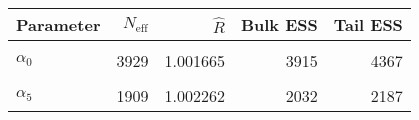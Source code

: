 \begin{table}[!h]
\centering
\begin{tabular}{>{\raggedright\arraybackslash}p{2cm}rrrr}
\toprule
Parameter & $N_{\text{eff}}$ & $\widehat{R}$ & Bulk ESS & Tail ESS\\
\midrule
\cellcolor{gray!6}{$\rho$} & \cellcolor{gray!6}{43125} & \cellcolor{gray!6}{1.000067} & \cellcolor{gray!6}{43177} & \cellcolor{gray!6}{41698}\\
$\alpha_{0}$ & 3929 & 1.001665 & 3915 & 4367\\
\cellcolor{gray!6}{$\alpha_{2}$} & \cellcolor{gray!6}{3150} & \cellcolor{gray!6}{1.002685} & \cellcolor{gray!6}{3558} & \cellcolor{gray!6}{2111}\\
$\alpha_{5}$ & 1909 & 1.002262 & 2032 & 2187\\
\bottomrule
\end{tabular}
\end{table}